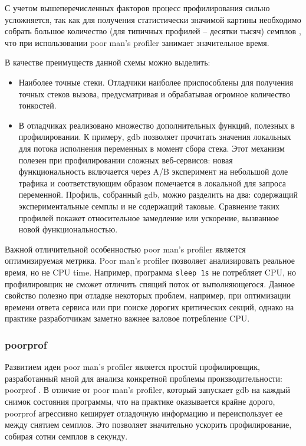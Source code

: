 С учетом вышеперечисленных факторов процесс профилирования сильно усложняется, так как для получения
статистически значимой картины необходимо собрать большое количество (для типичных профилей – десятки тысяч) семплов \cite{pmp:so, gprof:accuracy}, что при использовании poor man's profiler занимает значительное время.

В качестве преимуществ данной схемы можно выделить:
\begin{itemize}
    \item
        Наиболее точные стеки. Отладчики наиболее приспособлены для получения точных стеков вызова,
        предусматривая и обрабатывая огромное количество тонкостей.
    \item
        В отладчиках реализовано множество дополнительных функций, полезных в профилировании.
        К примеру, gdb позволяет прочитать значения локальных для потока исполнения переменных в момент сбора стека.
        Этот механизм полезен при профилировании сложных веб-сервисов: новая функциональность включается через A/B
        эксперимент на небольшой доле трафика и соответствующим образом помечается в локальной для запроса переменной.
        Профиль, собранный gdb, можно разделить на два: содержащий экспериментальные семплы и не содержащий таковые.
        Сравнение таких профилей покажет относительное замедление или ускорение, вызванное новой функциональностью.
\end{itemize}

Важной отличительной особенностью poor man's profiler является оптимизируемая метрика.
Poor man's profiler позволяет анализировать реальное время, но не CPU time.
Например, программа \verb!sleep 1s! не потребляет CPU, но профилировщик не сможет отличить спящий поток от выполняющегося.
Данное свойство полезно при отладке некоторых проблем, например, при оптимизации времени ответа сервиса или при поиске
дорогих критических секций, однако на практике разработчикам заметно важнее валовое потребление CPU.

\subsubsection{poorprof}
Развитием идеи poor man's profiler является простой профилировщик,
разработанный мной для анализа конкретной проблемы производительности: poorprof \cite{poorprof}.
В отличие от poor man's profiler, который запускает gdb на каждый снимок состояния программы,
что на практике оказывается крайне дорого, poorprof агрессивно кеширует отладочную информацию и переиспользует ее между снятием семплов.
Это позволяет значительно ускорить профилирование, собирая сотни семплов в секунду.

